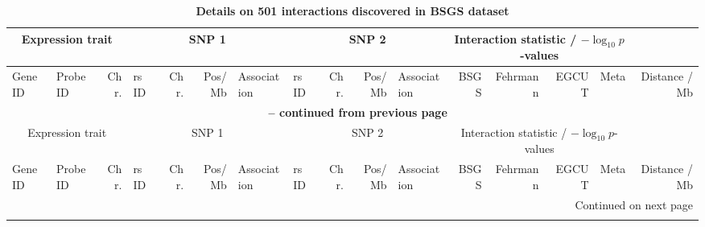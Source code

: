 \documentclass{article}
\begin{document}
\begin{landscape}

{\tiny

\begin{ThreePartTable}
\label{tab:results}
\begin{longtable}{|llr|lrrl|lrrl|rrrr|r|}

\caption{\textbf{Details on 501 interactions discovered in BSGS dataset}}\\

\hline
\multicolumn{3}{|c|}{Expression trait} & 
\multicolumn{4}{|c|}{SNP 1} & 
\multicolumn{4}{|c|}{SNP 2} & 
\multicolumn{4}{|c|}{Interaction statistic / $-\log_{10}p$-values} & \\
\hline
Gene ID\tnote{a} & 
Probe ID\tnote{b} & 
Chr. & 
rs ID & 
Chr. & 
Pos/Mb\tnote{c} & 
Association\tnote{d} & 
rs ID & 
Chr. & 
Pos/Mb\tnote{c} & 
Association\tnote{d} & 
BSGS\tnote{e} & 
Fehrmann\tnote{f} & 
EGCUT\tnote{f} & 
Meta\tnote{g} & 
Distance / Mb\tnote{h} \\
\hline
\endfirsthead


\multicolumn{16}{c}{{\bfseries \tablename\ \thetable{} -- continued from previous page}} \\
\hline
\multicolumn{3}{|c|}{Expression trait} & 
\multicolumn{4}{|c|}{SNP 1} & 
\multicolumn{4}{|c|}{SNP 2} & 
\multicolumn{4}{|c|}{Interaction statistic / $-\log_{10}p$-values} & \\
\hline
Gene ID\tnote{a} & 
Probe ID\tnote{b} & 
Chr. & 
rs ID & 
Chr. & 
Pos/Mb\tnote{c} & 
Association\tnote{d} & 
rs ID & 
Chr. & 
Pos/Mb\tnote{c} & 
Association\tnote{d} & 
BSGS\tnote{e} & 
Fehrmann\tnote{f} & 
EGCUT\tnote{f} & 
Meta\tnote{g} & 
Distance / Mb\tnote{h} \\
\hline
\endhead

\hline
\multicolumn{16}{r}{{Continued on next page}} \\
\endfoot

\hline \hline
\endlastfoot



\end{longtable}
\end{ThreePartTable}}
\end{landscape}
\end{document}
